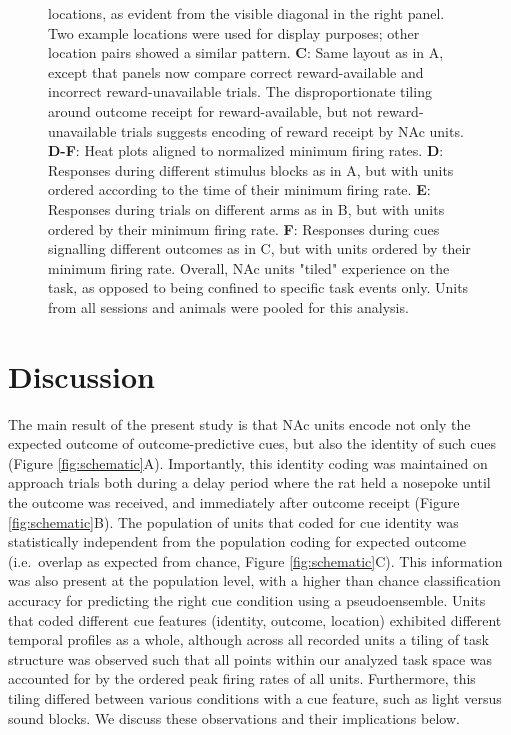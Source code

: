 \documentclass[11pt]{article}
\newcommand{\bsf}[1]{\textbf{#1}}
\begin{document}
\begin{figure}[ht!]
{locations, as evident from the visible diagonal in the right panel. Two
example locations were used for display purposes; other location pairs showed
a similar pattern. \bsf{C}: Same layout as in A, except that panels now compare
correct reward-available and incorrect reward-unavailable trials. The disproportionate tiling around outcome receipt for reward-available, but not reward-unavailable
trials suggests encoding of reward receipt by NAc units. \bsf{D-F}: Heat plots aligned to normalized minimum firing rates. \bsf{D}: Responses during different stimulus blocks as in A, but with units ordered according to
the time of their minimum firing rate. \bsf{E}: Responses during trials on different arms as in B, but with units ordered by their minimum
firing rate. \bsf{F}: Responses during cues signalling different outcomes as in C, but with units ordered by their minimum firing
rate. Overall, NAc units "tiled" experience on the task, as opposed to being
confined to specific task events only. Units from all sessions and animals
were pooled for this analysis.}
\label{fig:NP_tiling}
\end{figure} \clearpage

\section*{Discussion}

The main result of the present study is that NAc units encode not only
the expected outcome of outcome-predictive cues, but also the identity
of such cues (Figure \ref{fig:schematic}A). Importantly, this identity coding was maintained on
approach trials both during a delay period where the rat held a
nosepoke until the outcome was received, and immediately after outcome
receipt (Figure \ref{fig:schematic}B). The population of units that
coded for cue identity was statistically independent from the
population coding for expected outcome (i.e.\ overlap as expected from
chance, Figure \ref{fig:schematic}C). This information was also present at the population level, with a higher than chance classification accuracy for predicting the right cue condition using a pseudoensemble. Units that coded different cue
features (identity, outcome, location) exhibited different temporal
profiles as a whole, although across all recorded units a tiling of
task structure was observed such that all points within our analyzed
task space was accounted for by the ordered peak firing rates of all
units. Furthermore, this tiling differed between various conditions
with a cue feature, such as light versus sound blocks. We discuss
these observations and their implications below.
\end{document}
